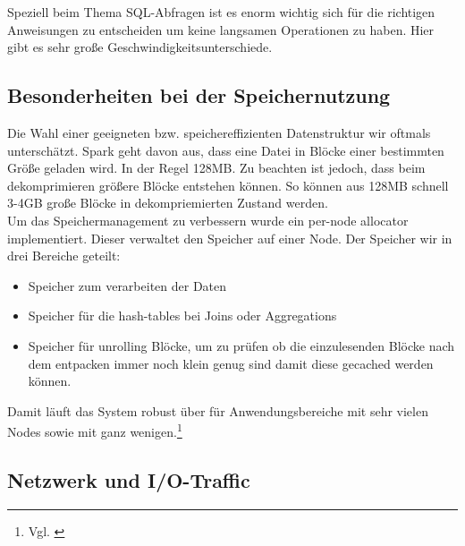 \noindent
Speziell beim Thema SQL-Abfragen ist es enorm wichtig sich für die richtigen Anweisungen zu entscheiden um keine langsamen Operationen zu haben. 
Hier gibt es sehr große Geschwindigkeitsunterschiede.



\subsection{Besonderheiten bei der Speichernutzung}
Die Wahl einer geeigneten bzw. speichereffizienten Datenstruktur wir oftmals unterschätzt. 
Spark geht davon aus, dass eine Datei in Blöcke einer bestimmten Größe geladen wird. In der Regel 128MB. Zu beachten ist jedoch, dass beim dekomprimieren größere Blöcke entstehen können. So können aus 128MB schnell 3-4GB große Blöcke in dekompriemierten Zustand werden. \\ 

\noindent
Um das Speichermanagement zu verbessern wurde ein per-node allocator implementiert. Dieser verwaltet den Speicher auf einer Node. 
Der Speicher wir in drei Bereiche geteilt:
\begin{itemize}
	\item Speicher zum verarbeiten der Daten
	\item Speicher für die hash-tables bei Joins oder Aggregations
	\item Speicher für \glqq{}unrolling\grqq{} Blöcke, um zu prüfen ob die einzulesenden Blöcke nach dem entpacken immer noch klein genug sind damit diese gecached werden können.
\end{itemize}
\noindent
Damit läuft das System robust über für Anwendungsbereiche mit sehr vielen Nodes sowie mit ganz wenigen.\footnote{Vgl. \cite{ADD+15}}

\subsection{Netzwerk und I/O-Traffic}


